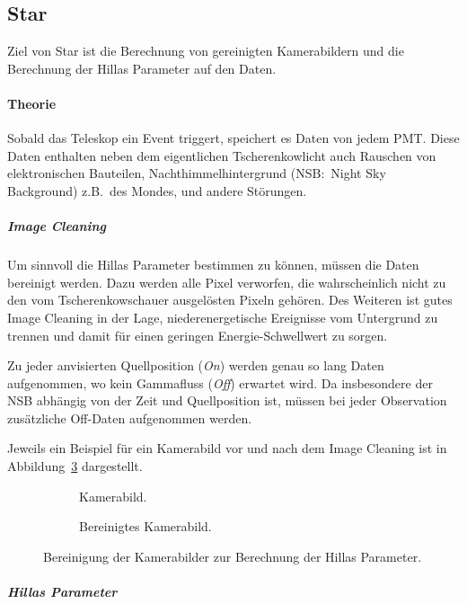 \subsection{Star}%
\label{sub:star}
Ziel von Star ist die Berechnung von gereinigten Kamerabildern und die Berechnung
der Hillas Parameter auf den Daten.

\paragraph{Theorie}
Sobald das Teleskop ein Event triggert,
speichert es Daten von jedem PMT.\@
Diese Daten enthalten neben dem eigentlichen Tscherenkowlicht auch
Rauschen von elektronischen Bauteilen,
Nachthimmelhintergrund (NSB:\ Night Sky Background) z.B.\ des Mondes,
und andere Störungen.

\subparagraph{Image Cleaning}
Um sinnvoll die Hillas Parameter bestimmen zu können,
müssen die Daten bereinigt werden.
Dazu werden alle Pixel verworfen, die wahrscheinlich nicht zu den
vom Tscherenkowschauer ausgelösten Pixeln gehören.
Des Weiteren ist gutes Image Cleaning in der Lage,
niederenergetische Ereignisse vom Untergrund zu trennen und damit
für einen geringen Energie-Schwellwert zu sorgen.

Zu jeder anvisierten Quellposition (\textit{On}) werden
genau so lang Daten aufgenommen,
wo kein Gammafluss (\textit{Off}) erwartet wird.
Da insbesondere der NSB abhängig von der Zeit und Quellposition ist,
müssen bei jeder Observation zusätzliche Off-Daten aufgenommen werden.

Jeweils ein Beispiel für ein Kamerabild vor und nach dem Image Cleaning ist in
Abbildung~\ref{fig:cleaning} dargestellt.

\begin{figure}[htpb]
	\centering
	\begin{subfigure}[c]{0.35\linewidth}
		\caption{Kamerabild.}%
		\label{fig:uncleaned}
	\end{subfigure}
	\begin{subfigure}[c]{0.35\linewidth}
		\caption{Bereinigtes Kamerabild.}%
		\label{fig:cleaned}
	\end{subfigure}
	\caption{Bereinigung der Kamerabilder zur Berechnung der Hillas Parameter.}%
	\label{fig:cleaning}
\end{figure}

\subparagraph{Hillas Parameter}%
\label{spar:hillas_parameter}

